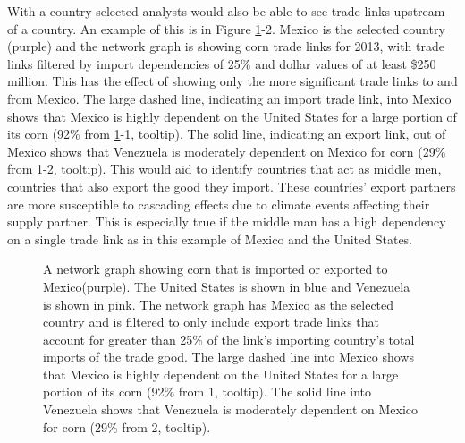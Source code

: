 			With a country selected analysts would also be able to see trade links upstream of a country. An example of this is in Figure \ref{mexicoMiddleMan}-2. Mexico is the selected country (purple) and the network graph is showing corn trade links for 2013, with trade links filtered by import dependencies of 25\% and dollar values of at least \$250 million. This has the effect of showing only the more significant trade links to and from Mexico. The large dashed line, indicating an import trade link, into Mexico shows that Mexico is highly dependent on the United States for a large portion of its corn (92\% from \ref{mexicoMiddleMan}-1, tooltip). The solid line, indicating an export link, out of Mexico shows that Venezuela is moderately dependent on Mexico for corn (29\% from \ref{mexicoMiddleMan}-2, tooltip). This would aid to identify countries that act as middle men, countries that also export the good they import. These countries' export partners are more susceptible to cascading effects due to climate events affecting their supply partner. This is especially true if the middle man has a high dependency on a single trade link as in this example of Mexico and the United States.\par
			\begin{figure}[htb]
				\caption[MEXICO AS A MIDDLE MAN FOR CORN]{A network graph showing corn that is imported or exported to Mexico(purple). The United States is shown in blue and Venezuela is shown in pink. The network graph has Mexico as the selected country and is filtered to only include export trade links that account for greater than 25\% of the link's importing country's total imports of the trade good. The large dashed line into Mexico shows that Mexico is highly dependent on the United States for a large portion of its corn (92\% from 1, tooltip). The solid line into Venezuela shows that Venezuela is moderately dependent on Mexico for corn (29\% from 2, tooltip).}
				\label{mexicoMiddleMan}
			\end{figure}
